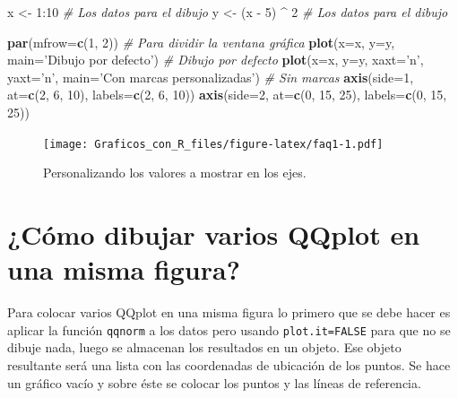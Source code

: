 \documentclass[10pt,]{krantz}
\makeatletter
\newenvironment{Shaded}{\begin{snugshade}}{\end{snugshade}}
\newcommand{\KeywordTok}[1]{\textcolor[rgb]{0.13,0.29,0.53}{\textbf{{#1}}}}
\newcommand{\DataTypeTok}[1]{\textcolor[rgb]{0.13,0.29,0.53}{{#1}}}
\newcommand{\DecValTok}[1]{\textcolor[rgb]{0.00,0.00,0.81}{{#1}}}
\newcommand{\StringTok}[1]{\textcolor[rgb]{0.31,0.60,0.02}{{#1}}}
\newcommand{\CommentTok}[1]{\textcolor[rgb]{0.56,0.35,0.01}{\textit{{#1}}}}
\newcommand{\NormalTok}[1]{{#1}}
\newenvironment{kframe}{%
\medskip{}
\setlength{\fboxsep}{.8em}
 \def\at@end@of@kframe{}%
 \ifinner\ifhmode%
  \def\at@end@of@kframe{\end{minipage}}%
  \begin{minipage}{\columnwidth}%
 \fi\fi%
 \def\FrameCommand##1{\hskip\@totalleftmargin \hskip-\fboxsep
 \colorbox{shadecolor}{##1}\hskip-\fboxsep
     \hskip-\linewidth \hskip-\@totalleftmargin \hskip\columnwidth}%
 \MakeFramed {\advance\hsize-\width
   \@totalleftmargin\z@ \linewidth\hsize
   \@setminipage}}%
 {\par\unskip\endMakeFramed%
 \at@end@of@kframe}
\renewenvironment{Shaded}{\begin{kframe}}{\end{kframe}}
\makeatother
\begin{document}
\begin{Shaded}
\begin{Highlighting}[]
\NormalTok{x <-}\StringTok{ }\DecValTok{1}\NormalTok{:}\DecValTok{10}          \CommentTok{# Los datos para el dibujo}
\NormalTok{y <-}\StringTok{ }\NormalTok{(x -}\StringTok{ }\DecValTok{5}\NormalTok{) ^}\StringTok{ }\DecValTok{2}   \CommentTok{# Los datos para el dibujo}

\KeywordTok{par}\NormalTok{(}\DataTypeTok{mfrow=}\KeywordTok{c}\NormalTok{(}\DecValTok{1}\NormalTok{, }\DecValTok{2}\NormalTok{)) }\CommentTok{# Para dividir la ventana gráfica}
\KeywordTok{plot}\NormalTok{(}\DataTypeTok{x=}\NormalTok{x, }\DataTypeTok{y=}\NormalTok{y, }\DataTypeTok{main=}\StringTok{'Dibujo por defecto'}\NormalTok{)  }\CommentTok{# Dibujo por defecto}
\KeywordTok{plot}\NormalTok{(}\DataTypeTok{x=}\NormalTok{x, }\DataTypeTok{y=}\NormalTok{y, }\DataTypeTok{xaxt=}\StringTok{'n'}\NormalTok{, }\DataTypeTok{yaxt=}\StringTok{'n'}\NormalTok{,}
     \DataTypeTok{main=}\StringTok{'Con marcas personalizadas'}\NormalTok{)  }\CommentTok{# Sin marcas}
\KeywordTok{axis}\NormalTok{(}\DataTypeTok{side=}\DecValTok{1}\NormalTok{, }\DataTypeTok{at=}\KeywordTok{c}\NormalTok{(}\DecValTok{2}\NormalTok{, }\DecValTok{6}\NormalTok{, }\DecValTok{10}\NormalTok{), }\DataTypeTok{labels=}\KeywordTok{c}\NormalTok{(}\DecValTok{2}\NormalTok{, }\DecValTok{6}\NormalTok{, }\DecValTok{10}\NormalTok{))}
\KeywordTok{axis}\NormalTok{(}\DataTypeTok{side=}\DecValTok{2}\NormalTok{, }\DataTypeTok{at=}\KeywordTok{c}\NormalTok{(}\DecValTok{0}\NormalTok{, }\DecValTok{15}\NormalTok{, }\DecValTok{25}\NormalTok{), }\DataTypeTok{labels=}\KeywordTok{c}\NormalTok{(}\DecValTok{0}\NormalTok{, }\DecValTok{15}\NormalTok{, }\DecValTok{25}\NormalTok{))}
\end{Highlighting}
\end{Shaded}

\begin{figure}[htbp]
\centering
\texttt{[image: Graficos\_con\_R\_files/figure-latex/faq1-1.pdf]}
\caption{\label{fig:faq1}Personalizando los valores a mostrar en los ejes.}
\end{figure}

\section{¿Cómo dibujar varios QQplot en una misma
figura?}\label{como-dibujar-varios-qqplot-en-una-misma-figura}

Para colocar varios QQplot en una misma figura lo primero que se debe
hacer es aplicar la función \texttt{qqnorm} a los datos pero usando
\texttt{plot.it=FALSE} para que no se dibuje nada, luego se almacenan
los resultados en un objeto. Ese objeto resultante será una lista con
las coordenadas de ubicación de los puntos. Se hace un gráfico vacío y
sobre éste se colocar los puntos y las líneas de referencia.
\end{document}
